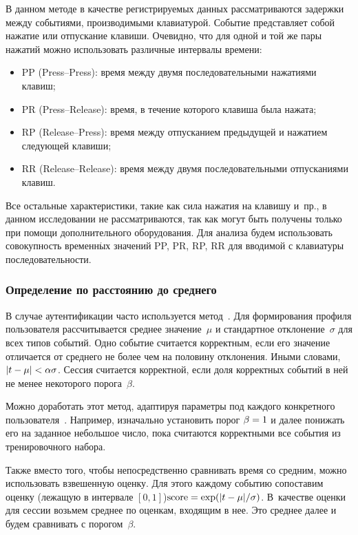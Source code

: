 \begin{multicols}{2}
В данном методе в качестве регистрируемых данных рассматриваются
задержки между событиями, производимыми клавиатурой. Событие
пред\-став\-ля\-ет собой нажатие или отпускание клавиши. Очевидно, что для
одной и той же пары нажатий можно использовать различные интервалы
времени:
\begin{itemize}
    \item PP (Press--Press): время между двумя последовательными нажатиями клавиш;
    \item PR (Press--Release): время, в течение которого клавиша была нажата;
    \item RP (Release--Press): время между отпусканием предыдущей и нажатием следующей клавиши;
    \item RR (Release--Release): время между двумя последовательными отпусканиями клавиш.
\end{itemize}
Все остальные характеристики, такие как сила нажатия на клавишу 
и~пр., в данном исследовании не рассматриваются, так как могут быть
получены только при помощи дополнительного оборудования. Для анализа
будем использовать совокупность временн$\acute{\mbox{ы}}$х значений PP, PR, RP, RR
для вводимой с клавиатуры последовательности.

\vspace*{-4pt}

\subsubsection{Определение по расстоянию до среднего}

В случае аутентификации часто используется метод~\cite{legett}. Для
формирования профиля пользователя рассчитывается среднее значение~$\mu$ 
и стандартное отклонение~$\sigma$ для всех типов событий. Одно
событие считается корректным, если его значение отличается от
среднего не более чем на половину отклонения. Иными словами, $|t\hm-
\mu| \hm< \alpha  \sigma$. Сессия считается корректной, если доля
корректных событий в ней не менее некоторого порога~$\beta$.

Можно доработать этот метод, адаптируя параметры под каждого
конкретного пользователя~\cite{hocquet}. Например, изначально
установить порог $\beta \hm= 1$ и далее понижать его на заданное
небольшое число, пока считаются корректными все события из
тренировочного набора.

Также вместо того, чтобы непосредственно сравнивать время со
средним, можно использовать взвешенную оценку. Для этого каждому
событию сопоставим оценку (лежащую в интервале $[0,1]$)\linebreak $\mathrm{score} \hm=
\exp ({|t-\mu|/\sigma})$. В~качестве оценки для сессии возьмем
среднее по оценкам, входящим в нее. Это среднее далее и будем
сравнивать с порогом~$\beta$.


\end{multicols}
